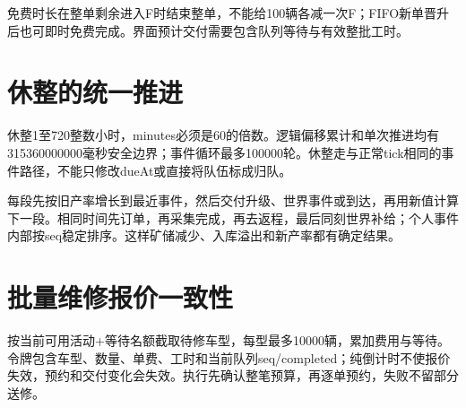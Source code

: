 免费时长在整单剩余进入F时结束整单，不能给100辆各减一次F；FIFO新单晋升后也可即时免费完成。界面预计交付需要包含队列等待与有效整批工时。

\section{休整的统一推进}
休整1至720整数小时，minutes必须是60的倍数。逻辑偏移累计和单次推进均有315360000000毫秒安全边界；事件循环最多100000轮。休整走与正常tick相同的事件路径，不能只修改dueAt或直接将队伍标成归队。

每段先按旧产率增长到最近事件，然后交付升级、世界事件或到达，再用新值计算下一段。相同时间先订单，再采集完成，再去返程，最后同刻世界补给；个人事件内部按seq稳定排序。这样矿储减少、入库溢出和新产率都有确定结果。

\section{批量维修报价一致性}
按当前可用活动+等待名额截取待修车型，每型最多10000辆，累加费用与等待。令牌包含车型、数量、单费、工时和当前队列seq/completed；纯倒计时不使报价失效，预约和交付变化会失效。执行先确认整笔预算，再逐单预约，失败不留部分送修。
